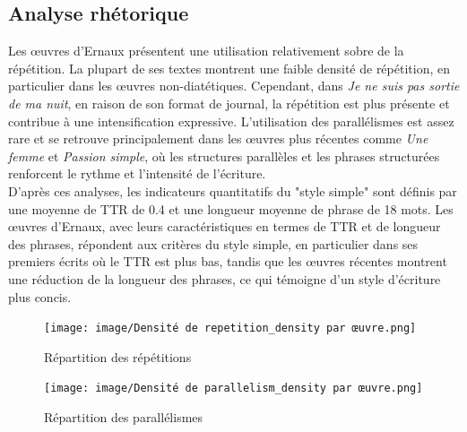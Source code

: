 \newpage

\subsection{Analyse rhétorique}
Les œuvres d'Ernaux présentent une utilisation relativement sobre de la répétition. La plupart de ses textes montrent une faible densité de répétition, en particulier dans les œuvres non-diatétiques. Cependant, dans \textit{Je ne suis pas sortie de ma nuit}, en raison de son format de journal, la répétition est plus présente et contribue à une intensification expressive. L'utilisation des parallélismes est assez rare et se retrouve principalement dans les œuvres plus récentes comme \textit{Une femme} et \textit{Passion simple}, où les structures parallèles et les phrases structurées renforcent le rythme et l’intensité de l’écriture.\\

D'après ces analyses, les indicateurs quantitatifs du "style simple" sont définis par une moyenne de TTR de 0.4 et une longueur moyenne de phrase de 18 mots. Les œuvres d'Ernaux, avec leurs caractéristiques en termes de TTR et de longueur des phrases, répondent aux critères du style simple, en particulier dans ses premiers écrits où le TTR est plus bas, tandis que les œuvres récentes montrent une réduction de la longueur des phrases, ce qui témoigne d'un style d'écriture plus concis.
\begin{figure}[ht!]
    \centering
    \texttt{[image: image/Densité de repetition\_density par œuvre.png]}
    \caption{Répartition des répétitions}
    \label{fig:repartition_repetitions}
\end{figure}

\vspace{1cm}

\begin{figure}[ht!]
    \centering
    \texttt{[image: image/Densité de parallelism\_density par œuvre.png]}
    \caption{Répartition des parallélismes}
    \label{fig:repartition_parallels}
\end{figure}

\newpage

